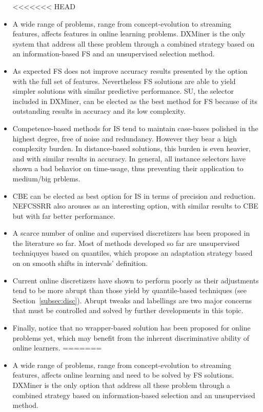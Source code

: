 \documentclass[preprint,12pt]{elsarticle}
\begin{document}
\begin{itemize}

<<<<<<< HEAD
	\item A wide range of problems, range from concept-evolution to streaming features, affects features in online learning problems. DXMiner is the only system that address all these problem through a combined strategy based on an information-based FS and an unsupervised selection method.
	\item As expected FS does not improve accuracy results presented by the option with the full set of features. Nevertheless FS solutions are able to yield simpler solutions with similar predictive performance. SU, the selector included in DXMiner, can be elected as the best method for FS because of its outstanding results in accuracy and its low complexity.
	\item Competence-based methods for IS tend to maintain case-bases polished in the highest degree, free of noise and redundancy. However they bear a high complexity burden. In distance-based solutions, this burden is even heavier, and with similar results in accuracy. In general, all instance selectors have shown a bad behavior on time-usage, thus preventing their application to medium/big prblems.
	\item CBE can be elected as best option for IS in terms of precision and reduction. NEFCSSRR also arouses as an interesting option, with similar results to CBE but with far better performance.
	\item A scarce number of online and supervised discretizers has been proposed in the literature so far. Most of methods developed so far are unsupervised techniquyes based on quantiles, which propose an adaptation strategy based on on smooth shifts in intervals' definition.
	\item Current online discretizers have shown to perform poorly as their adjustments tend to be more abrupt than those yield by quantile-based techniques (see Section~\ref{subsec:disc}). Abrupt tweaks and labellings are two major concerns that must be controlled and solved by further developments in this topic.	
	\item Finally, notice that no wrapper-based solution has been proposed for online problems yet, which may benefit from the inherent discriminative ability of online learners. 
=======
	\item A wide range of problems, range from concept-evolution to streaming features, affects online learning and need to be solved by FS solutions. DXMiner is the only option that address all these problem through a combined strategy based on information-based selection and an unsupervised method.

\end{itemize}
\end{document}
